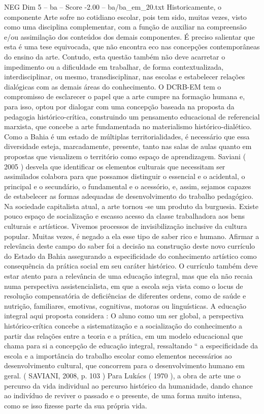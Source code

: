 \begin{textsample}{NEG Dim 5 – ba – Score -2.00 – ba/ba\_em\_20.txt}
Historicamente, o componente Arte sofre no cotidiano escolar, pois tem sido, muitas vezes, visto como uma disciplina complementar, com a função de auxiliar na compreensão e/ou assimilação dos conteúdos dos demais componentes.
É preciso salientar que esta é uma tese equivocada, que não encontra eco nas concepções contemporâneas do ensino da arte.
Contudo, esta questão também não deve acarretar o impedimento ou a dificuldade em trabalhar, de forma contextualizada, interdisciplinar, ou mesmo, transdisciplinar, nas escolas e estabelecer relações dialógicas com as demais áreas do conhecimento.
O DCRB-EM tem o compromisso de esclarecer o papel que a arte cumpre na formação humana e, para isso, optou por dialogar com uma concepção baseada na proposta da pedagogia histórico-crítica, construindo um pensamento educacional de referencial marxista, que concebe a arte fundamentada no materialismo histórico-dialético.
Como a Bahia é um estado de múltiplas territorialidades, é necessário que essa diversidade esteja, marcadamente, presente, tanto nas salas de aulas quanto em propostas que visualizem o território como espaço de aprendizagem.
Saviani ( 2005 ) desvela que identificar os elementos culturais que necessitam ser assimilados colabora para que possamos distinguir o essencial e o acidental, o principal e o secundário, o fundamental e o acessório, e, assim, sejamos capazes de estabelecer as formas adequadas de desenvolvimento do trabalho pedagógico.
Na sociedade capitalista atual, a arte tornou -se um produto da burguesia.
Existe pouco espaço de socialização e escasso acesso da classe trabalhadora aos bens culturais e artísticos.
Vivemos processos de invisibilização inclusive da cultura popular.
Muitas vezes, é negado a ela esse tipo de saber rico e humano.
Afirmar a relevância deste campo do saber foi a decisão na construção deste novo currículo do Estado da Bahia assegurando a especificidade do conhecimento artístico como consequência da prática social em seu caráter histórico.
O currículo também deve estar atento para a relevância de uma educação integral, mas que ela não recaia numa perspectiva assistencialista, em que a escola seja vista como o locus de resolução compensatória de deficiências de diferentes ordens, como de saúde e nutrição, familiares, emotivas, cognitivas, motoras ou linguísticas.
A educação integral aqui proposta considera : O aluno como um ser global, a perspectiva histórico-crítica concebe a sistematização e a socialização do conhecimento a partir das relações entre a teoria e a prática, em um modelo educacional que chama para si a concepção de educação integral, ressaltando “ a especificidade da escola e a importância do trabalho escolar como elementos necessários ao desenvolvimento cultural, que concorrem para o desenvolvimento humano em geral. ( SAVIANI, 2008, p. 103 ) Para Lukács ( 1970 ), a obra de arte une o percurso da vida individual ao percurso histórico da humanidade, dando chance ao indivíduo de reviver o passado e o presente, de uma forma muito intensa, como se isso fizesse parte da sua própria vida.

\end{textsample}
